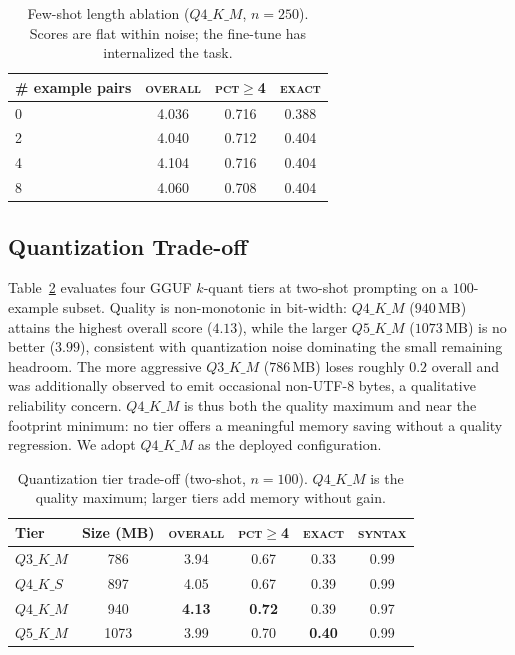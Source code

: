 \documentclass[conference]{IEEEtran}
\begin{document}
\begin{table}[t]
\caption{Few-shot length ablation ($Q4\_K\_M$, $n{=}250$). Scores are flat within
noise; the fine-tune has internalized the task.}
\label{tab:fewshot}
\centering
\footnotesize
\begin{tabular}{lccc}
\toprule
\# example pairs & \textsc{overall} & \textsc{pct$\geq$4} & \textsc{exact} \\
\midrule
0 & 4.036 & 0.716 & 0.388 \\
2 & 4.040 & 0.712 & 0.404 \\
4 & 4.104 & 0.716 & 0.404 \\
8 & 4.060 & 0.708 & 0.404 \\
\bottomrule
\end{tabular}
\end{table}

\subsection{Quantization Trade-off}

Table~\ref{tab:quant} evaluates four GGUF $k$-quant tiers at two-shot prompting
on a $100$-example subset. Quality is non-monotonic in bit-width: $Q4\_K\_M$
($940$\,MB) attains the highest overall score ($4.13$), while the larger
$Q5\_K\_M$ ($1073$\,MB) is no better ($3.99$), consistent with quantization
noise dominating the small remaining headroom. The more aggressive $Q3\_K\_M$
($786$\,MB) loses roughly $0.2$ overall and was additionally observed to emit
occasional non-UTF-8 bytes, a qualitative reliability concern. $Q4\_K\_M$ is thus
both the quality maximum and near the footprint minimum: no tier offers a
meaningful memory saving without a quality regression. We adopt $Q4\_K\_M$ as the
deployed configuration.

\begin{table}[t]
\caption{Quantization tier trade-off (two-shot, $n{=}100$). $Q4\_K\_M$ is the
quality maximum; larger tiers add memory without gain.}
\label{tab:quant}
\centering
\footnotesize
\begin{tabular}{lccccc}
\toprule
Tier & Size (MB) & \textsc{overall} & \textsc{pct$\geq$4} & \textsc{exact} & \textsc{syntax} \\
\midrule
$Q3\_K\_M$ & 786  & 3.94 & 0.67 & 0.33 & 0.99 \\
$Q4\_K\_S$ & 897  & 4.05 & 0.67 & 0.39 & 0.99 \\
$Q4\_K\_M$ & 940  & \textbf{4.13} & \textbf{0.72} & 0.39 & 0.97 \\
$Q5\_K\_M$ & 1073 & 3.99 & 0.70 & \textbf{0.40} & 0.99 \\
\bottomrule
\end{tabular}
\end{table}
\end{document}
